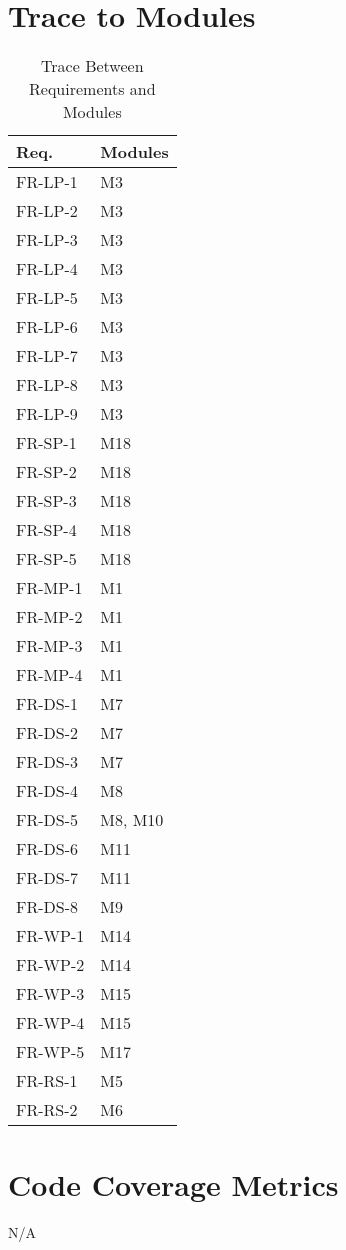 \documentclass[12pt, titlepage]{article}
\begin{document}
\section{Trace to Modules}		
\begin{table}[H]
\centering
\small
\renewcommand{\arraystretch}{0.9}
\begin{tabular}{p{} p{}}
	\toprule
	\textbf{Req.} & \textbf{Modules}\\
	\midrule
	FR-LP-1 & M3\\
	FR-LP-2 & M3\\
	FR-LP-3 & M3\\
	FR-LP-4 & M3\\
	FR-LP-5 & M3\\
	FR-LP-6 & M3\\
	FR-LP-7 & M3\\
	FR-LP-8 & M3\\
	FR-LP-9 & M3\\
	FR-SP-1 & M18\\
	FR-SP-2 & M18\\
	FR-SP-3 & M18\\
	FR-SP-4 & M18\\
	FR-SP-5 & M18\\
	FR-MP-1 & M1\\
	FR-MP-2 & M1\\
	FR-MP-3 & M1\\
	FR-MP-4 & M1\\
	FR-DS-1 & M7\\
	FR-DS-2 & M7\\
	FR-DS-3 & M7\\
	FR-DS-4 & M8\\
	FR-DS-5 & M8, M10\\
	FR-DS-6 & M11\\
	FR-DS-7 & M11\\
	FR-DS-8 & M9\\
	FR-WP-1 & M14\\
	FR-WP-2 & M14\\
	FR-WP-3 & M15\\
	FR-WP-4 & M15\\
	FR-WP-5 & M17\\
	FR-RS-1 & M5\\
	FR-RS-2 & M6\\
	\bottomrule
\end{tabular}
\caption{Trace Between Requirements and Modules}
\label{TblRT}
\end{table}
\section{Code Coverage Metrics}
N/A
\end{document}

